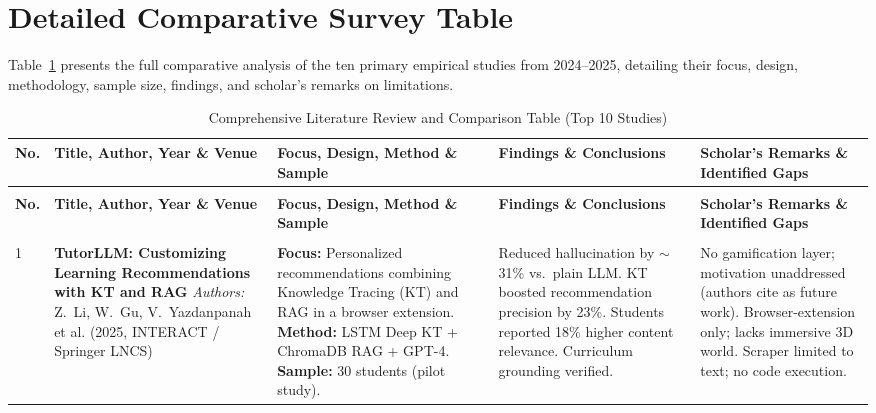 \section{Detailed Comparative Survey Table}
Table~\ref{tab:litreview} presents the full comparative analysis of the ten primary empirical studies from 2024--2025, detailing their focus, design, methodology, sample size, findings, and scholar's remarks on limitations.

\clearpage
\begingroup
\footnotesize
\renewcommand{\arraystretch}{1.15}
\setlength{\tabcolsep}{4pt}
\begin{longtable}{|>{\raggedright\arraybackslash}p{}|>{\raggedright\arraybackslash}p{}|>{\raggedright\arraybackslash}p{}|>{\raggedright\arraybackslash}p{}|>{\raggedright\arraybackslash}p{}|}
\caption{Comprehensive Literature Review and Comparison Table (Top 10 Studies)}\label{tab:litreview}\\
\hline
\rowcolor{gray!25}\textbf{No.} & \textbf{Title, Author, Year \& Venue} & \textbf{Focus, Design, Method \& Sample} & \textbf{Findings \& Conclusions} & \textbf{Scholar's Remarks \& Identified Gaps}\\ \hline
\endfirsthead
\multicolumn{5}{c}{\tablename\ \thetable\ -- \textit{Continued from previous page}} \\
\hline
\rowcolor{gray!25}\textbf{No.} & \textbf{Title, Author, Year \& Venue} & \textbf{Focus, Design, Method \& Sample} & \textbf{Findings \& Conclusions} & \textbf{Scholar's Remarks \& Identified Gaps}\\ \hline
\endhead
\hline \multicolumn{5}{r}{\textit{Continued on next page}} \\
\endfoot
\hline
\endlastfoot

1 & 
\textbf{TutorLLM: Customizing Learning Recommendations with KT and RAG} \cite{li2025tutorllm}\newline
\textit{Authors:} Z.~Li, W.~Gu, V.~Yazdanpanah et al. (2025, INTERACT / Springer LNCS) & 
\textbf{Focus:} Personalized recommendations combining Knowledge Tracing (KT) and RAG in a browser extension.\newline
\textbf{Method:} LSTM Deep KT + ChromaDB RAG + GPT-4.\newline
\textbf{Sample:} 30 students (pilot study). & 
Reduced hallucination by $\sim$31\% vs.\ plain LLM. KT boosted recommendation precision by 23\%. Students reported 18\% higher content relevance. Curriculum grounding verified. & 
No gamification layer; motivation unaddressed (authors cite as future work). Browser-extension only; lacks immersive 3D world. Scraper limited to text; no code execution.\\ \hline


\end{longtable}
